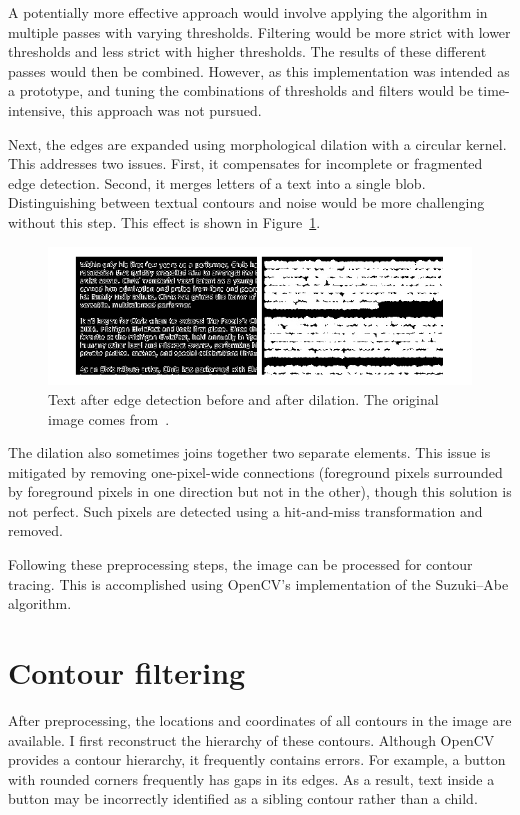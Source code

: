 \documentclass[
  digital,     %
  oneside,     %
  nosansbold,  %
  nocolorbold, %
  lof,         %
  lot,         %
]{fithesis4}
\begin{document}
A potentially more effective approach would involve applying the algorithm in multiple passes with varying thresholds. Filtering would be more strict with lower thresholds and less strict with higher thresholds. The results of these different passes would then be combined. However, as this implementation was intended as a prototype, and tuning the combinations of thresholds and filters would be time-intensive, this approach was not pursued.

Next, the edges are expanded using morphological dilation with a circular kernel. This addresses two issues. First, it compensates for incomplete or fragmented edge detection. Second, it merges letters of a text into a single blob. Distinguishing between textual contours and noise would be more challenging without this step. This effect is shown in Figure~\ref{fig:dilation}.

\begin{figure}
    \centering
    \includegraphics[width=1\linewidth]{diagrams/dilation.pdf}
    \caption{Text after edge detection before and after dilation. The original image comes from~\cite{aydos2020}.}
    \label{fig:dilation}
\end{figure}

The dilation also sometimes joins together two separate elements. This issue is mitigated by removing one-pixel-wide connections (foreground pixels surrounded by foreground pixels in one direction but not in the other), though this solution is not perfect. Such pixels are detected using a hit-and-miss transformation and removed.

Following these preprocessing steps, the image can be processed for contour tracing. This is accomplished using OpenCV's implementation of the Suzuki–Abe algorithm.

\section{Contour filtering}

After preprocessing, the locations and coordinates of all contours in the image are available. I first reconstruct the hierarchy of these contours. Although OpenCV provides a contour hierarchy, it frequently contains errors. For example, a button with rounded corners frequently has gaps in its edges. As a result, text inside a button may be incorrectly identified as a sibling contour rather than a child.
\end{document}
